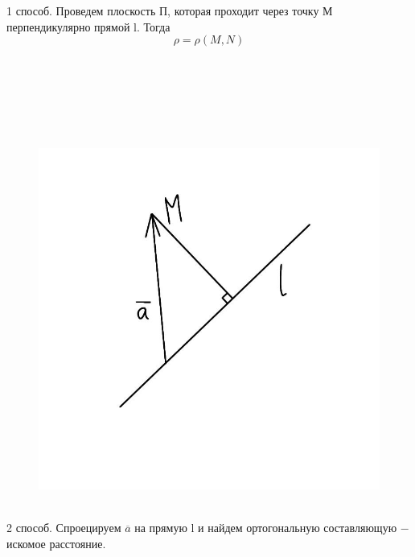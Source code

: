     1 способ. Проведем плоскость П, которая проходит через точку М перпендикулярно прямой l. Тогда
    \[
    \rho = \rho(M, N)
    \]

    \tab\\ \tab\\ \tab\\ \tab\\ \tab\\

\begin{figure}
    \includegraphics[width=0.84\linewidth]{images/3.3.jpeg}
\end{figure}
\tab\\

    2 способ. Спроецируем $\overline{a}$ на прямую l и найдем ортогональную составляющую $-$ искомое расстояние.

    \tab\\ \tab\\ \tab\\ \tab\\ \tab\\ \tab\\ \tab\\

